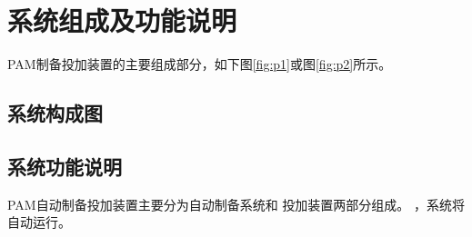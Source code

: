 \documentclass[UTF8,a4paper,12pt,titlepage]{ctexart}
\begin{document}


\tableofcontents %

\newpage %

\section{系统组成及功能说明}

   PAM制备投加装置的主要组成部分，如下图\ref{fig:p1}或图\ref{fig:p2}所示。
   \subsection{系统构成图}

   

\newpage %

   

   \subsection{系统功能说明}
      PAM自动制备投加装置主要分为自动制备系统和 投加装置两部分组成。
      ，系统将自动运行。
\end{document}
